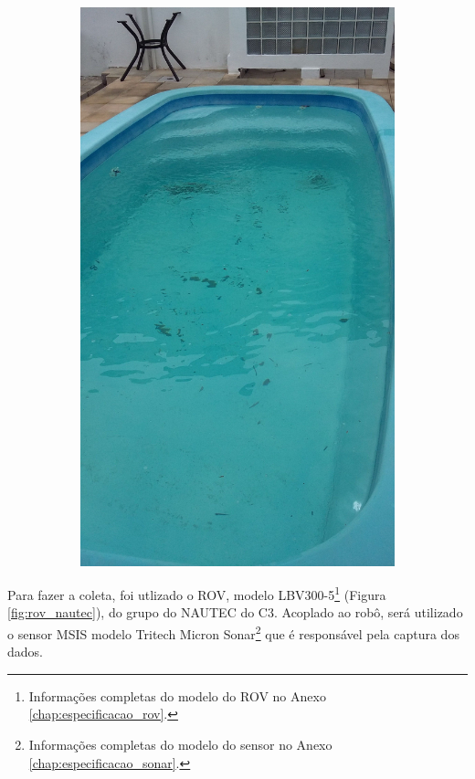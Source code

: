 \begin{figure}[H]
\begin{subfigure}[t]{0.25\textwidth}
        \includegraphics[width=\textwidth]{dados/figuras/piscina_2.jpg}
    \end{subfigure}
\end{figure}

Para fazer a coleta, foi utlizado o ROV, modelo LBV300-5\footnote{Informações completas do modelo do ROV no Anexo \ref{chap:especificacao_rov}.} (Figura \ref{fig:rov_nautec}), do grupo do NAUTEC do C3. 
Acoplado ao robô, será utilizado o sensor MSIS modelo Tritech Micron Sonar\footnote{Informações completas do modelo do sensor no Anexo \ref{chap:especificacao_sonar}.} que é responsável pela captura dos dados.

